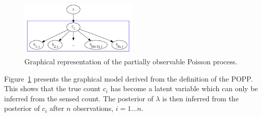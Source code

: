 \begin{figure}[t!]
	\centering
%    	
    	
    \includegraphics[width=0.5\textwidth]{./figures/gm_popp.png}
	\caption{Graphical representation of the partially observable Poisson process.}
	\label{fig:gm_popp}
\end{figure}





Figure~\ref{fig:gm_popp} presents the graphical model derived from the definition of the POPP. This shows that the true count $c_i$ has become a latent variable which can only be inferred from the sensed count.
% 
The posterior of $\lambda$ is then inferred from the posterior of $c_i$ after $n$ observations, $i = 1 \ldots n$. 

